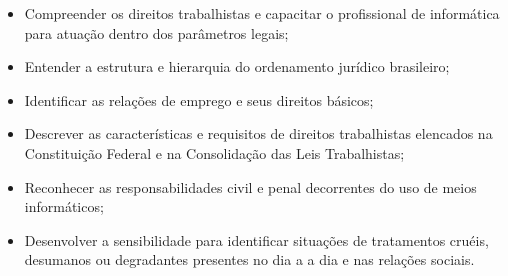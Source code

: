 \begin{itemize}

\item Compreender os direitos trabalhistas e capacitar o profissional de informática para atuação dentro dos parâmetros legais;

\item Entender a estrutura e hierarquia do ordenamento jurídico brasileiro;

\item Identificar as relações de emprego e seus direitos básicos;

\item Descrever as características e requisitos de direitos trabalhistas elencados na Constituição Federal e na Consolidação das Leis Trabalhistas;

\item Reconhecer as responsabilidades civil e penal decorrentes do uso de meios informáticos;

\item Desenvolver a sensibilidade para identificar situações de tratamentos cruéis, desumanos ou degradantes presentes no dia a a dia e nas relações sociais. 

\end{itemize}








